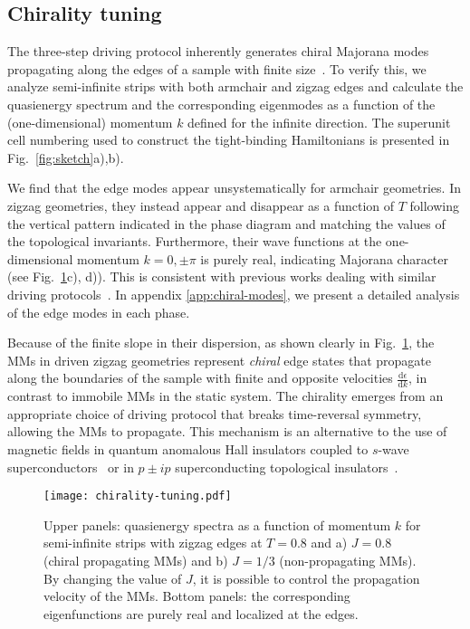 \documentclass[aps,prb,twocolumn,superscriptaddress,groupedaddress]{revtex4}
\begin{document}
\subsection{Chirality tuning}
\label{subsec:chirality-tuning}


The three-step driving protocol inherently generates chiral Majorana modes propagating along the edges of a sample with finite size~\cite{Sato:2010, Po:2017, Fulga:2019}.
To verify this, we analyze semi-infinite strips with both armchair and zigzag edges and calculate the quasienergy spectrum and the corresponding eigenmodes as a function of the (one-dimensional) momentum $k$ defined for the infinite direction.
The superunit cell numbering used to construct the tight-binding Hamiltonians is presented in Fig.~\ref{fig:sketch}a),b).

We find that the edge modes appear unsystematically for armchair geometries.
In zigzag geometries, they instead appear and disappear as a function of $T$ following the vertical pattern indicated in the phase diagram and matching the values of the topological invariants.
Furthermore, their wave functions at the one-dimensional momentum $k=0, \pm\pi$ is purely real, indicating Majorana character (see Fig.~\ref{fig:chirality-tuning}c), d)).
This is consistent with previous works dealing with similar driving protocols~\cite{Po:2017, Fulga:2019}.
In appendix \ref{app:chiral-modes}, we present a detailed analysis of the edge modes in each phase.

Because of the finite slope in their dispersion, as shown clearly in Fig.~\ref{fig:chirality-tuning}, the MMs in driven zigzag geometries represent \emph{chiral} edge states that propagate along the boundaries of the sample with finite and opposite velocities $\frac{\mathrm{d} \epsilon}{\mathrm{d} k}$,
 in contrast to  immobile MMs in the static system.
The chirality  emerges from an appropriate  choice of driving protocol that breaks time-reversal symmetry, allowing the MMs to propagate.
This mechanism is an alternative to the use of magnetic fields in quantum anomalous Hall insulators coupled to $s$-wave superconductors~\cite{Qi:2010, Chung:2011, Wang:2015, He:2017, Lian:2018, Hoegl:2020} or in $p\pm ip$ superconducting topological insulators~\cite{Chiu:2018, WangPRL:2018, He:2019}.

\begin{figure}
\centering
\texttt{[image: chirality-tuning.pdf]}
\caption{Upper panels: quasienergy spectra as a function of momentum $k$ for semi-infinite strips with zigzag edges at $T=0.8$ and a) $J=0.8$ (chiral propagating MMs) and b) $J=1/3$ (non-propagating MMs).
By changing the value of $J$, it is possible to control the propagation velocity of the MMs.
Bottom panels: the corresponding eigenfunctions are purely real and localized at the edges.}
\label{fig:chirality-tuning}
\end{figure}
\end{document}
